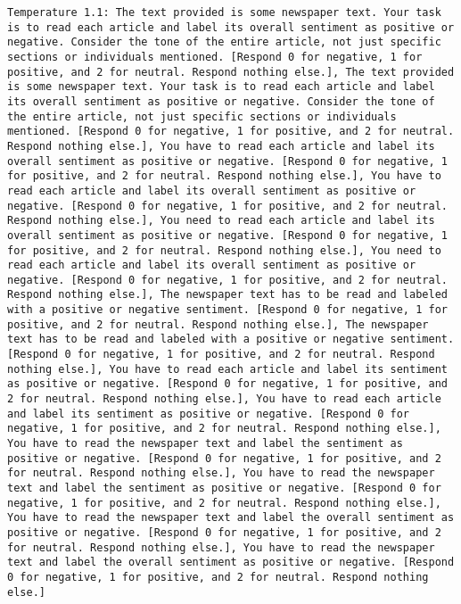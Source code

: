 \begin{lstlisting}[label=lst:poor_performing_prompts]
	Temperature 1.1: The text provided is some newspaper text. Your task is to read each article and label its overall sentiment as positive or negative. Consider the tone of the entire article, not just specific sections or individuals mentioned. [Respond 0 for negative, 1 for positive, and 2 for neutral. Respond nothing else.], The text provided is some newspaper text. Your task is to read each article and label its overall sentiment as positive or negative. Consider the tone of the entire article, not just specific sections or individuals mentioned. [Respond 0 for negative, 1 for positive, and 2 for neutral. Respond nothing else.], You have to read each article and label its overall sentiment as positive or negative. [Respond 0 for negative, 1 for positive, and 2 for neutral. Respond nothing else.], You have to read each article and label its overall sentiment as positive or negative. [Respond 0 for negative, 1 for positive, and 2 for neutral. Respond nothing else.], You need to read each article and label its overall sentiment as positive or negative. [Respond 0 for negative, 1 for positive, and 2 for neutral. Respond nothing else.], You need to read each article and label its overall sentiment as positive or negative. [Respond 0 for negative, 1 for positive, and 2 for neutral. Respond nothing else.], The newspaper text has to be read and labeled with a positive or negative sentiment. [Respond 0 for negative, 1 for positive, and 2 for neutral. Respond nothing else.], The newspaper text has to be read and labeled with a positive or negative sentiment. [Respond 0 for negative, 1 for positive, and 2 for neutral. Respond nothing else.], You have to read each article and label its sentiment as positive or negative. [Respond 0 for negative, 1 for positive, and 2 for neutral. Respond nothing else.], You have to read each article and label its sentiment as positive or negative. [Respond 0 for negative, 1 for positive, and 2 for neutral. Respond nothing else.], You have to read the newspaper text and label the sentiment as positive or negative. [Respond 0 for negative, 1 for positive, and 2 for neutral. Respond nothing else.], You have to read the newspaper text and label the sentiment as positive or negative. [Respond 0 for negative, 1 for positive, and 2 for neutral. Respond nothing else.], You have to read the newspaper text and label the overall sentiment as positive or negative. [Respond 0 for negative, 1 for positive, and 2 for neutral. Respond nothing else.], You have to read the newspaper text and label the overall sentiment as positive or negative. [Respond 0 for negative, 1 for positive, and 2 for neutral. Respond nothing else.]

\end{lstlisting}
